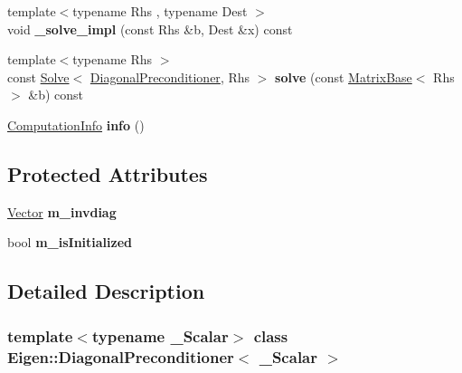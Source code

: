 \begin{DoxyCompactItemize}
{\footnotesize template$<$typename Rhs , typename Dest $>$ }\\void {\bfseries \+\_\+solve\+\_\+impl} (const Rhs \&b, Dest \&x) const
\item 
\mbox{\label{class_eigen_1_1_diagonal_preconditioner_a0b42a9d87d619347f92f703f162f375f}} 
{\footnotesize template$<$typename Rhs $>$ }\\const \mbox{\hyperlink{class_eigen_1_1_solve}{Solve}}$<$ \mbox{\hyperlink{class_eigen_1_1_diagonal_preconditioner}{Diagonal\+Preconditioner}}, Rhs $>$ {\bfseries solve} (const \mbox{\hyperlink{class_eigen_1_1_matrix_base}{Matrix\+Base}}$<$ Rhs $>$ \&b) const
\item 
\mbox{\label{class_eigen_1_1_diagonal_preconditioner_a83769941faa301e9f414ecdf6a715140}} 
\mbox{\hyperlink{group__enums_ga85fad7b87587764e5cf6b513a9e0ee5e}{Computation\+Info}} {\bfseries info} ()
\end{DoxyCompactItemize}
\subsection*{Protected Attributes}
\begin{DoxyCompactItemize}
\item 
\mbox{\label{class_eigen_1_1_diagonal_preconditioner_abce7e6e756519949b58f201ef486d162}} 
\mbox{\hyperlink{class_eigen_1_1_matrix}{Vector}} {\bfseries m\+\_\+invdiag}
\item 
\mbox{\label{class_eigen_1_1_diagonal_preconditioner_a180911e1c0f848621dab8e29b5da88dc}} 
bool {\bfseries m\+\_\+is\+Initialized}
\end{DoxyCompactItemize}


\subsection{Detailed Description}
\subsubsection*{template$<$typename \+\_\+\+Scalar$>$\newline
class Eigen\+::\+Diagonal\+Preconditioner$<$ \+\_\+\+Scalar $>$}

